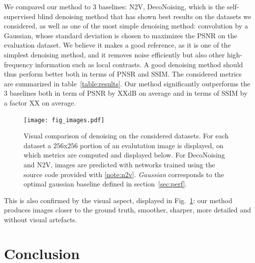 \documentclass{article}
\begin{document}
We compared our method to 3 baselines: N2V, DecoNoising, which is the self-supervised blind denoising method that has shown best results on the datasets we considered, as well as one of the most simple denoising method: convolution by a Gaussian, whose standard deviation is chosen to maximizes the PSNR on the evaluation dataset.
We believe it makes a good reference, as it is one of the simplest denoising method, and it removes noise efficiently but also other high-frequency information such as local contrasts.
A good denoising method should thus perform better both in terms of PNSR and SSIM.
The considered metrics are summarized in table~\ref{table:results}.
Our method significantly outperforms the 3 baselines both in term of PSNR by XXdB on average and in terms of SSIM by a factor XX on average.

\begin{figure}[ht]
\label{fig:images}
\vskip 0.2in
\begin{center}
\texttt{[image: fig\_images.pdf]}
\caption{Visual comparison of denoising on the considered datasets. For each dataset a $256$x$256$ portion of an evalutation image is displayed, on which metrics are computed and displayed below. For DecoNoising and N2V, images are predicted with networks trained using the source code provided with \cite{goncharova2020}\cref{note:n2v}. \textit{Gaussian} corresponds to the optimal gaussian baseline defined in section~\ref{sec:perf}.}
\label{fig:images}
\end{center}
\vskip -0.2in
\end{figure}

This is also confirmed by the visual aspect, displayed in Fig.~\ref{fig:images}: our method produces images closer to the ground truth, smoother, sharper, more detailed and without visual artefacts.


\section{Conclusion}



{\small


}
\end{document}
